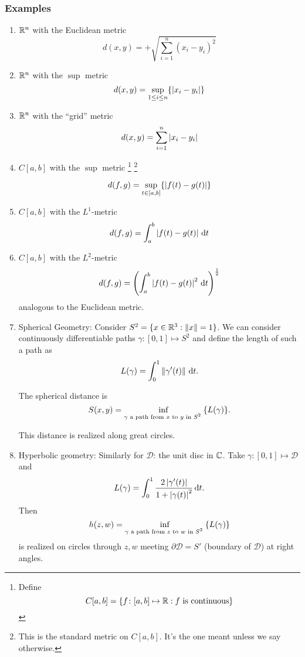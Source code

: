 \documentclass{notes}
\theoremstyle{plain}
\begin{document}
\subsubsection{Examples}
\begin{enumerate}
\item
$ \mathbb{R}^{n} $ with the Euclidean metric
\[ d(x,y) = + \sqrt{ \sum_{i=1}^{n}(x_{i}-y_{i})^{2}} \]

\item
$ \mathbb{R}^{n} $ with the $ \sup $ metric
\[ d(x,y) = \sup_{1 \leq i \leq n}\{ \left|x_{i}-y_{i}\right| \} \]

\item
$ \mathbb{R}^{n} $ with the ``grid'' metric
\[ d(x,y) = \sum_{i=1}^{n}\left|x_{i}-y_{i}\right| \]

\item
$ C[a,b] $ with the $ \sup $ metric%
\footnote{%
Define
\[ C[a,b] = \{ f\colon [a,b] \mapsto \mathbb{R}: f \text{ is continuous} \}
\]}%
\footnote{This is the standard metric on $ C[a,b] 
$.  It's the one meant unless we say otherwise.}

\[ d(f,g)=\sup_{t \in [a,b]}\{ \left|f(t)-g(t)\right|\} \]

\item $ C[a,b] $ with the $ L^{1} $-metric
\[ d(f,g)= \int_{a}^{b}\left|f(t)-g(t)\right|\,\mathrm{d} t \]

\item
$ C[a,b] $ with the $ L^{2} $-metric
\[ d(f,g) = \left( \int_{a}^{b}\left|f(t)-g(t)\right|^{2}\,\mathrm{d} t 
\right)^{\frac{1}{2}} \]
analogous to the Euclidean metric.

\item
Spherical Geometry: Consider $S^{2} = \{ x \in \mathbb{R}^{3}: \left\|x\right\|=1 \}$.
We can consider continuously differentiable paths $ \gamma\colon [0,1] 
\mapsto S^{2} $ and define the length of such a path as
\[ L(\gamma) = \int_{0}^{1}\left\| \gamma'(t) \right\|\, \mathrm{d} t. \]

The spherical distance is
\[ S(x,y) = \inf_{\text{$ \gamma $ a path from $ x $ to $ y $ 
in $ S^{2} $ }}\{L(\gamma)\}. \]

This distance is realized along great circles.

\item Hyperbolic geometry: Similarly for $ \mathcal{D} $: the unit
  disc in $ \mathbb{C} $.  Take $ \gamma\colon [0,1] \mapsto \mathcal{D} $ and
\[
L(\gamma) = \int_{0}^{1}\frac{2
  \left|\gamma'(t)\right|}{1+\left|\gamma(t)\right|^{2}}\,\mathrm{d} t.
\]
Then
\[ h(z,w) = \inf_{\text{$ \gamma $ a path from $ z $ to $ w $ 
in $ S^{2} $ }}\{L(\gamma)\} \]
is realized on circles through $ z,w $ meeting $ \partial 
\mathcal{D} = S' $ (boundary of $ \mathcal{D} $) at right angles.


\end{enumerate}
\end{document}
